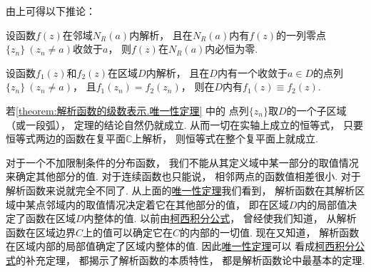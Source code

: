 由上可得以下推论：
\begin{corollary}
设函数\(f(z)\)在邻域\(N_R(a)\)内解析，
且在\(N_R(a)\)内有\(f(z)\)的一列零点\(\{z_n\}\ (z_n \neq a)\)收敛于\(a\)，
则\(f(z)\)在\(N_R(a)\)内必恒为零.
\end{corollary}

\begin{theorem}[唯一性定理]\label{theorem:解析函数的级数表示.唯一性定理}
设函数\(f_1(z)\)和\(f_2(z)\)在区域\(D\)内解析，
且在\(D\)内有一个收敛于\(a \in D\)的点列\(\{z_n\}\ (z_n \neq a)\)，
且\(f_1(z_n) = f_2(z_n)\)，
则在\(D\)内有\(f_1(z) \equiv f_2(z)\).
\end{theorem}

若\cref{theorem:解析函数的级数表示.唯一性定理} 中的
点列\(\{z_n\}\)取\(D\)的一个子区域（或一段弧），
定理的结论自然仍就成立.
从而一切在实轴上成立的恒等式，
只要恒等式两边的函数在复平面\(\mathbb{C}\)上解析，
则恒等式在整个复平面上就成立.

对于一个不加限制条件的分布函数，
我们不能从其定义域中某一部分的取值情况来确定其他部分的值.
对于连续函数也只能说，
相邻两点的函数值相差很小.
对于解析函数来说就完全不同了.
从上面的\hyperref[theorem:解析函数的级数表示.唯一性定理]{唯一性定理}我们看到，
解析函数在其解析区域中某点邻域内的取值情况决定着它在其他部分的值，
即在区域\(D\)内的局部值决定了函数在区域\(D\)内整体的值.
以前由\hyperref[equation:解析函数的积分表示.柯西积分公式]{柯西积分公式}，
曾经使我们知道，
从解析函数在区域边界\(C\)上的值可以确定它在\(C\)的内部的一切值.
现在又知道，
解析函数在区域内部的局部值确定了区域内整体的值.
因此\hyperref[theorem:解析函数的级数表示.唯一性定理]{唯一性定理}可以
看成\hyperref[equation:解析函数的积分表示.柯西积分公式]{柯西积分公式}的补充定理，
都揭示了解析函数的本质特性，
都是解析函数论中最基本的定理.
